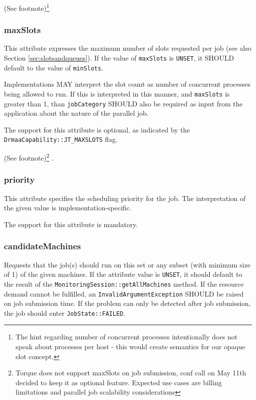 \documentclass{article}
\newcommand{\h}[1]{\lstinline|#1|}
\newcommand{\rat}[1]{ {\tiny(See footnote)}\footnote{#1} }
\begin{document}
\rat{The hint regarding number of concurrent processes intentionally does not speak about processes per host - this would create semantics for our opaque slot concept.}

\subsubsection{maxSlots}

This attribute expresses the maximum number of slots requested per job (see also Section \ref{sec:slotsandqueues}). If the value of \h{maxSlots} is \h{UNSET}, it SHOULD default to the value of \h{minSlots}.

Implementations MAY interpret the slot count as number of concurrent processes being allowed to run. If this is interpreted in this manner, and \h{maxSlots} is greater than 1, than \h{jobCategory} SHOULD also be required as input from the application about the nature of the parallel job.

The support for this attribute is optional, as indicated by the \h{DrmaaCapability::JT_MAXSLOTS} flag.

\rat{Torque does not support maxSlots on job submission, conf call on May 11th decided to keep it as optional feature. Expected use cases are billing limitations and parallel job scalability considerations}.

\subsubsection{priority}

This attribute specifies the scheduling priority for the job. The interpretation of the given value is implementation-specific.

The support for this attribute is mandatory.

\subsubsection{candidateMachines}

Requests that the job(s) should run on this set or any subset (with minimum size of 1) of the given machines. If the attribute value is \h{UNSET}, it should default to the result of the \h{MonitoringSession::getAllMachines} method. If the resource demand cannot be fulfilled, an \h{InvalidArgumentException} SHOULD be raised on job submission time. If the problem can only be detected after job submission, the job should enter \h{JobState::FAILED}. 
\end{document}
